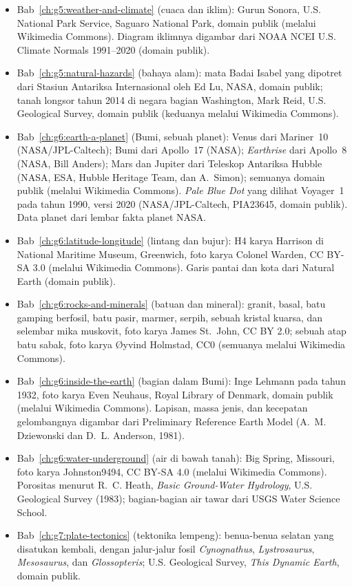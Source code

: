 \begin{itemize}
  \item Bab~\ref{ch:g5:weather-and-climate} (cuaca dan iklim): Gurun Sonora, U.S. National Park Service, Saguaro National Park, domain publik (melalui Wikimedia Commons). Diagram iklimnya digambar dari NOAA NCEI U.S. Climate Normals 1991--2020 (domain publik).
  \item Bab~\ref{ch:g5:natural-hazards} (bahaya alam): mata Badai Isabel yang dipotret dari Stasiun Antariksa Internasional oleh Ed Lu, NASA, domain publik; tanah longsor tahun 2014 di negara bagian Washington, Mark Reid, U.S. Geological Survey, domain publik (keduanya melalui Wikimedia Commons).
  \item Bab~\ref{ch:g6:earth-a-planet} (Bumi, sebuah planet): Venus dari Mariner~10 (NASA/JPL-Caltech); Bumi dari Apollo~17 (NASA); \emph{Earthrise} dari Apollo~8 (NASA, Bill Anders); Mars dan Jupiter dari Teleskop Antariksa Hubble (NASA, ESA, Hubble Heritage Team, dan A.~Simon); semuanya domain publik (melalui Wikimedia Commons). \emph{Pale Blue Dot} yang dilihat Voyager~1 pada tahun 1990, versi 2020 (NASA/JPL-Caltech, PIA23645, domain publik). Data planet dari lembar fakta planet NASA.
  \item Bab~\ref{ch:g6:latitude-longitude} (lintang dan bujur): H4 karya Harrison di National Maritime Museum, Greenwich, foto karya Colonel Warden, CC BY-SA 3.0 (melalui Wikimedia Commons). Garis pantai dan kota dari Natural Earth (domain publik).
  \item Bab~\ref{ch:g6:rocks-and-minerals} (batuan dan mineral): granit, basal, batu gamping berfosil, batu pasir, marmer, serpih, sebuah kristal kuarsa, dan selembar mika muskovit, foto karya James St.~John, CC BY 2.0; sebuah atap batu sabak, foto karya Øyvind Holmstad, CC0 (semuanya melalui Wikimedia Commons).
  \item Bab~\ref{ch:g6:inside-the-earth} (bagian dalam Bumi): Inge Lehmann pada tahun 1932, foto karya Even Neuhaus, Royal Library of Denmark, domain publik (melalui Wikimedia Commons). Lapisan, massa jenis, dan kecepatan gelombangnya digambar dari Preliminary Reference Earth Model (A.~M. Dziewonski dan D.~L. Anderson, 1981).
  \item Bab~\ref{ch:g6:water-underground} (air di bawah tanah): Big Spring, Missouri, foto karya Johnston9494, CC BY-SA 4.0 (melalui Wikimedia Commons). Porositas menurut R.~C. Heath, \emph{Basic Ground-Water Hydrology}, U.S. Geological Survey (1983); bagian-bagian air tawar dari USGS Water Science School.
  \item Bab~\ref{ch:g7:plate-tectonics} (tektonika lempeng): benua-benua selatan yang disatukan kembali, dengan jalur-jalur fosil \emph{Cynognathus}, \emph{Lystrosaurus}, \emph{Mesosaurus}, dan \emph{Glossopteris}; U.S. Geological Survey, \emph{This Dynamic Earth}, domain publik.

\end{itemize}
